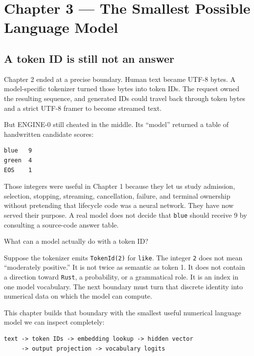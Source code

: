 \documentclass[
  10pt,
]{article}
\begin{document}
\clearpage

\section{Chapter 3 --- The Smallest Possible Language
Model}\label{chapter-3-the-smallest-possible-language-model}

\subsection{A token ID is still not an
answer}\label{a-token-id-is-still-not-an-answer}

Chapter 2 ended at a precise boundary. Human text became UTF-8 bytes. A
model-specific tokenizer turned those bytes into token IDs. The request
owned the resulting sequence, and generated IDs could travel back
through token bytes and a strict UTF-8 framer to become streamed text.

But ENGINE-0 still cheated in the middle. Its ``model'' returned a table
of handwritten candidate scores:

\begin{verbatim}
blue   9
green  4
EOS    1
\end{verbatim}

Those integers were useful in Chapter 1 because they let us study
admission, selection, stopping, streaming, cancellation, failure, and
terminal ownership without pretending that lifecycle code was a neural
network. They have now served their purpose. A real model does not
decide that \texttt{blue} should receive 9 by consulting a source-code
answer table.

What can a model actually do with a token ID?

Suppose the tokenizer emits \texttt{TokenId(2)} for \texttt{like}. The
integer \texttt{2} does not mean ``moderately positive.'' It is not
twice as semantic as token 1. It does not contain a direction toward
\texttt{Rust}, a probability, or a grammatical role. It is an index in
one model vocabulary. The next boundary must turn that discrete identity
into numerical data on which the model can compute.

This chapter builds that boundary with the smallest useful numerical
language model we can inspect completely:

\begin{verbatim}
text -> token IDs -> embedding lookup -> hidden vector
     -> output projection -> vocabulary logits
\end{verbatim}
\end{document}
